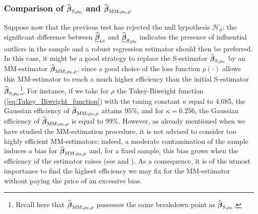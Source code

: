 \subsubsection{Comparison of $\widehat{\boldsymbol\beta}_{\mathrm{S};\rho_{0}}$ and $\widehat{\boldsymbol\beta}_{\mathrm{MM};\rho_{0},\rho}$}

Suppose now that the previous test has rejected the null hypothesis
$\mathcal{H}_{0}$: the significant difference between $\sthat{\underline
{\boldsymbol\beta}}_{\stsc{LS}}$ and $\widehat{\underline
{\boldsymbol\beta}}_{\mathrm{S};\rho_{0}}$ indicates the presence of
influential outliers in the sample and a robust regression estimator should
then be preferred. In this case, it might be a good strategy to replace the
S-estimator $\widehat{\boldsymbol\beta}_{\mathrm{S};\rho_{0}}$ by an
MM-estimator $\widehat{\boldsymbol\beta}_{\mathrm{MM};\rho_{0},\rho}$, since
a good choice of the loss function $\rho\left(  \cdot\right)  $ allows this
MM-estimator to reach a much higher efficiency than the initial S-estimator
$\widehat{\boldsymbol\beta}_{\mathrm{S};\rho_{0}}$\footnote{Recall here that
$\widehat{\boldsymbol\beta}_{\mathrm{MM};\rho_{0},\rho}$ possesses the same
breakdown point as $\widehat{\boldsymbol\beta}_{\mathrm{S};\rho_{0}}$.}. For
instance, if we take for $\rho$ the Tukey-Biweight function
(\ref{eq:Tukey_Biweight_function}) with the tuning constant $\kappa$ equal to
4.685, the Gaussian efficiency of $\sthat{\boldsymbol\beta}_{\mathrm{MM}%
;\rho_{0},\rho}$ attains 95\%, and for $\kappa=6.256$, the Gaussian efficiency
of $\widehat{\boldsymbol\beta}_{\mathrm{MM};\rho_{0},\rho}$ is equal to
99\%. However, as already mentioned when we have studied the MM-estimation
procedure, it is not advised to consider too highly efficient MM-estimators:
indeed, a moderate contamination of the sample induces a bias for
$\widehat{\boldsymbol\beta}_{\mathrm{MM};\rho_{0},\rho}$ and, for a fixed
sample, this bias grows when the efficiency of the estimator raises (see
\citealp{maronna:etal:2006} and \citealp{Omelka:2010}).
As a consequence, it is of the utmost importance to find the highest
efficiency we may fix for the MM-estimator without paying the price of an
excessive bias.

